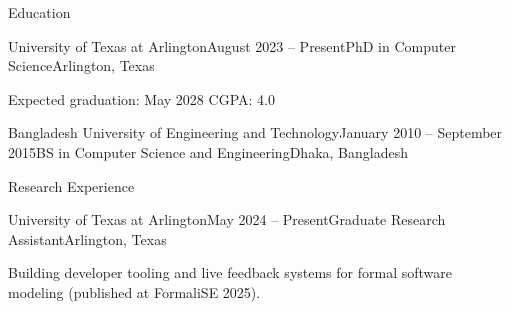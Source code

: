 \documentclass{resume}
\begin{document}
\begin{rSection}{Education}

\begin{rSubsection}{University of Texas at Arlington}{August 2023 -- Present}{PhD in Computer Science}{Arlington, Texas}
  \item Expected graduation: May 2028 \quad CGPA: 4.0
\end{rSubsection}

\begin{rSubsection}{Bangladesh University of Engineering and Technology}{January 2010 -- September 2015}{BS in Computer Science and Engineering}{Dhaka, Bangladesh}
  \item[]
\end{rSubsection}

\end{rSection}

\begin{rSection}{Research Experience}

\begin{rResearch}{University of Texas at Arlington}{May 2024 -- Present}{Graduate Research Assistant}{Arlington, Texas}
  \item Building developer tooling and live feedback systems for formal software modeling (published at FormaliSE 2025).
\end{rResearch}

\end{rSection}
\end{document}
